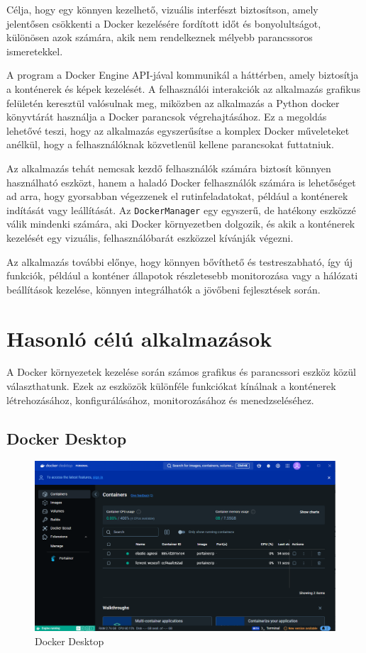 Célja, hogy egy könnyen kezelhető, vizuális interfészt biztosítson, amely jelentősen csökkenti a Docker kezelésére fordított időt és bonyolultságot, különösen azok számára, akik nem rendelkeznek mélyebb parancssoros ismeretekkel.

A program a Docker Engine API-jával kommunikál a háttérben, amely biztosítja a konténerek és képek kezelését. A felhasználói interakciók az alkalmazás grafikus felületén keresztül valósulnak meg, miközben az alkalmazás a Python docker könyvtárát használja a Docker parancsok végrehajtásához. Ez a megoldás lehetővé teszi, hogy az alkalmazás egyszerűsítse a komplex Docker műveleteket anélkül, hogy a felhasználóknak közvetlenül kellene parancsokat futtatniuk.

Az alkalmazás tehát nemcsak kezdő felhasználók számára biztosít könnyen használható eszközt, hanem a haladó Docker felhasználók számára is lehetőséget ad arra, hogy gyorsabban végezzenek el rutinfeladatokat, például a konténerek indítását vagy leállítását. Az \texttt{DockerManager} egy egyszerű, de hatékony eszközzé válik mindenki számára, aki Docker környezetben dolgozik, és akik a konténerek kezelését egy vizuális, felhasználóbarát eszközzel kívánják végezni.

Az alkalmazás további előnye, hogy könnyen bővíthető és testreszabható, így új funkciók, például a konténer állapotok részletesebb monitorozása vagy a hálózati beállítások kezelése, könnyen integrálhatók a jövőbeni fejlesztések során.

\section{Hasonló célú alkalmazások }

A Docker környezetek kezelése során számos grafikus és parancssori eszköz közül választhatunk. Ezek az eszközök különféle funkciókat kínálnak a konténerek létrehozásához, konfigurálásához, monitorozásához és menedzseléséhez.

\subsection{Docker Desktop}
\begin{figure}[H]
	\centering
	\includegraphics[width=0.7\linewidth]{images/Docker_desktop}
	\caption{Docker Desktop}
	\label{fig:dockerdesktop}
\end{figure}


